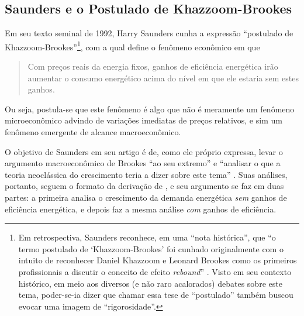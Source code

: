 

\subsection{Saunders e o Postulado de Khazzoom-Brookes}
Em seu texto seminal de 1992, Harry Saunders cunha a expressão ``postulado de Khazzoom-Brookes''\footnote{Em retrospectiva, Saunders reconhece, em uma ``nota histórica'', que ``o termo postulado de `Khazzoom-Brookes' foi cunhado originalmente com o intuito de reconhecer Daniel Khazzoom e Leonard Brookes como os primeiros profissionais a discutir o conceito de efeito \textit{rebound}'' \parencite{Saunders2000}. Visto em seu contexto histórico, em meio aos diversos (e não raro acalorados) debates sobre este tema, poder-se-ia dizer que chamar essa tese de ``postulado'' também buscou evocar uma imagem de ``rigorosidade''.}, com a qual define o fenômeno econômico em que
\begin{quote}
Com preços reais da energia fixos, ganhos de eficiência energética irão aumentar o consumo energético acima do nível em que ele estaria sem estes ganhos. \parencite[p. 135]{Saunders1992}
\end{quote}
Ou seja, postula-se que este fenômeno é algo que não é meramente um fenômeno microeconômico advindo de variações imediatas de preços relativos, e sim um fenômeno emergente de alcance macroeconômico.

O objetivo de Saunders em seu artigo é de, como ele próprio expressa, levar o argumento macroeconômico de Brookes ``ao seu extremo'' e ``analisar o que a teoria neoclássica do crescimento teria a dizer sobre este tema'' \parencite[p. 132]{Saunders1992}. Suas análises, portanto, seguem o formato da derivação de \textcite{Solow1956}, e seu argumento se faz em duas partes: a primeira analisa o crescimento da demanda energética \textit{sem} ganhos de eficiência energética, e depois faz a mesma análise \textit{com} ganhos de eficiência.

